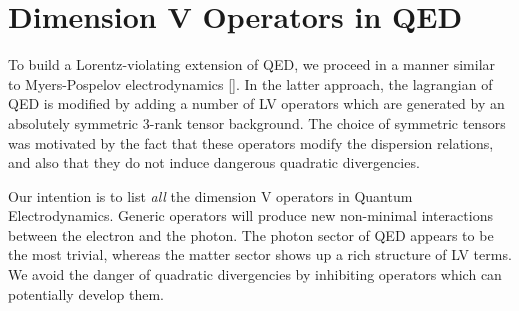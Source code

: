 \documentclass[12pt]{revtex4}
\begin{document}
	

\section{Dimension V Operators in QED}

	To build a Lorentz-violating extension of QED, we proceed in a manner
	similar to Myers-Pospelov electrodynamics [].
	In the latter approach, the lagrangian of QED is modified by adding
	a number of LV operators which are generated by an absolutely
	symmetric 3-rank tensor background.
	The choice of symmetric tensors was motivated by the fact that
	these operators modify the dispersion relations, and also that
	they do not induce dangerous quadratic divergencies.

	Our intention is to list {\it all} the dimension V operators in 
	Quantum Electrodynamics. 
	Generic operators will produce new non-minimal interactions between
	the electron and the photon. 
	The photon sector of QED appears to be the most trivial, whereas
	the matter sector shows up a rich structure of LV terms.
	We avoid the danger of quadratic divergencies by inhibiting operators
	which can potentially develop them.
\end{document}
